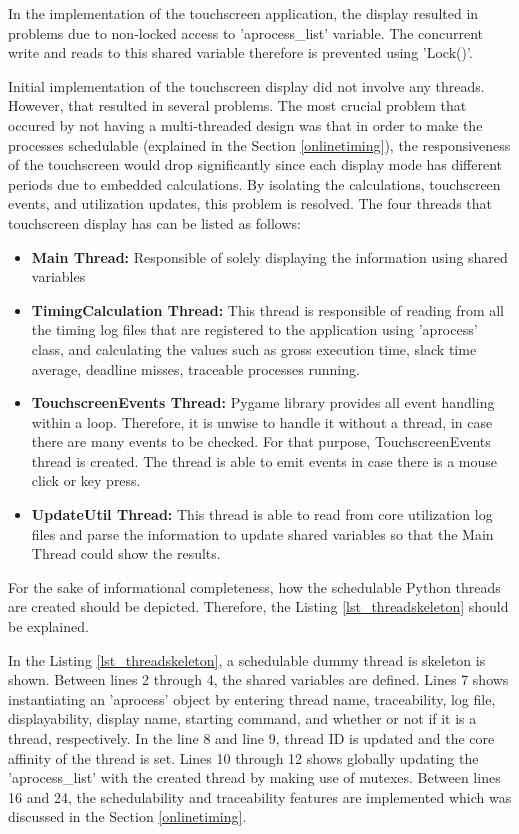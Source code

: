 In the implementation of the touchscreen application, the display resulted in problems due to non-locked access to 'aprocess{\_}list' variable. The concurrent write and reads to this shared variable therefore is prevented using 'Lock()'.

Initial implementation of the touchscreen display did not involve any threads. However, that resulted in several problems. The most crucial problem that occured by not having a multi-threaded design was that in order to make the processes schedulable (explained in the Section \ref{onlinetiming}), the responsiveness of the touchscreen would drop significantly since each display mode has different periods due to embedded calculations. By isolating the calculations, touchscreen events, and utilization updates, this problem is resolved. The four threads that touchscreen display has can be listed as follows:

\begin{itemize}
	\item \textbf{Main Thread:} Responsible of solely displaying the information using shared variables
	\item \textbf{TimingCalculation Thread:} This thread is responsible of reading from all the timing log files that are registered to the application using 'aprocess' class, and calculating the values such as gross execution time, slack time average, deadline misses, traceable processes running.
	\item \textbf{TouchscreenEvents Thread:} Pygame library provides all event handling within a loop. Therefore, it is unwise to handle it without a thread, in case there are many events to be checked. For that purpose, TouchscreenEvents thread is created. The thread is able to emit events in case there is a mouse click or key press.
	\item \textbf{UpdateUtil Thread:} This thread is able to read from core utilization log files and parse the information to update shared variables so that the Main Thread could show the results.
\end{itemize}

For the sake of informational completeness, how the schedulable Python threads are created should be depicted. Therefore, the Listing  \ref{lst_threadskeleton} should be explained.



In the Listing \ref{lst_threadskeleton}, a schedulable dummy thread is skeleton is shown. Between lines 2 through 4, the shared variables are defined. Lines 7 shows instantiating an 'aprocess' object by entering thread name, traceability, log file, displayability, display name, starting command, and whether or not if it is a thread, respectively. In the line 8 and line 9, thread ID is updated and the core affinity of the thread is set. Lines 10 through 12 shows globally updating the 'aprocess{\_}list' with the created thread by making use of mutexes. Between lines 16 and 24, the schedulability and traceability features are implemented which was discussed in the Section \ref{onlinetiming}.

